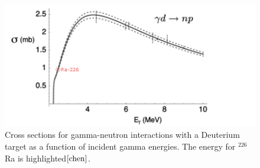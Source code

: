 \documentclass[%
12pt,
twoside,
reprint,
amsmath,amssymb,
aps,
]{article}
\begin{document}
	\begin{figure}[H]
		\includegraphics[scale = 1.8, center]{Images/deuterium_cross_section.png}
		\caption{\label{tab:table-name} Cross sections for gamma-neutron interactions with a Deuterium target as a function of incident gamma energies. The energy for $^{226}$Ra is highlighted${\cite{chen}}$.}
	\end{figure}
\end{document}
